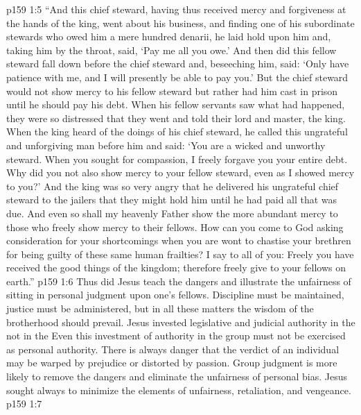 \vs p159 1:5 \textcolor{ubdarkred}{“And this chief steward, having thus received mercy and forgiveness at the hands of the king, went about his business, and finding one of his subordinate stewards who owed him a mere hundred denarii, he laid hold upon him and, taking him by the throat, said, ‘Pay me all you owe.’ And then did this fellow steward fall down before the chief steward and, beseeching him, said: ‘Only have patience with me, and I will presently be able to pay you.’ But the chief steward would not show mercy to his fellow steward but rather had him cast in prison until he should pay his debt. When his fellow servants saw what had happened, they were so distressed that they went and told their lord and master, the king. When the king heard of the doings of his chief steward, he called this ungrateful and unforgiving man before him and said: ‘You are a wicked and unworthy steward. When you sought for compassion, I freely forgave you your entire debt. Why did you not also show mercy to your fellow steward, even as I showed mercy to you?’ And the king was so very angry that he delivered his ungrateful chief steward to the jailers that they might hold him until he had paid all that was due. And even so shall my heavenly Father show the more abundant mercy to those who freely show mercy to their fellows. How can you come to God asking consideration for your shortcomings when you are wont to chastise your brethren for being guilty of these same human frailties? I say to all of you: Freely you have received the good things of the kingdom; therefore freely give to your fellows on earth.”}
\vs p159 1:6 \pc Thus did Jesus teach the dangers and illustrate the unfairness of sitting in personal judgment upon one’s fellows. Discipline must be maintained, justice must be administered, but in all these matters the wisdom of the brotherhood should prevail. Jesus invested legislative and judicial authority in the  not in the  Even this investment of authority in the group must not be exercised as personal authority. There is always danger that the verdict of an individual may be warped by prejudice or distorted by passion. Group judgment is more likely to remove the dangers and eliminate the unfairness of personal bias. Jesus sought always to minimize the elements of unfairness, retaliation, and vengeance.
\vs p159 1:7 
